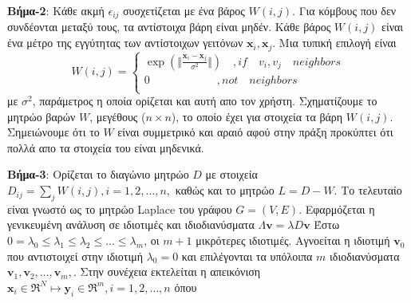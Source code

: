 \par
\textbf{Βήμα-2}: Κάθε ακμή $\epsilon_{ij}$ συσχετίζεται με ένα βάρος $W(i,j)$. Για κόμβους που δεν συνδέονται μεταξύ τους, τα αντίστοιχα βάρη είναι μηδέν. Κάθε βάρος $W(i,j)$ είναι ένα μέτρο της εγγύτητας των αντίστοιχων γειτόνων $\mathbf{x}_{i},\mathbf{x}_{j}$. Μια τυπική επιλογή είναι \\
\newline\hspace*{\fill}
\[W(i,j) = \begin{cases} \exp(\Vert \frac{\mathbf{x}_{i}-\mathbf{x}_{j}}{\sigma^{2}} \Vert) \quad ,if \quad v_{i},v_{j} \quad neighbors\\
               0  \quad \quad \quad \quad \quad \quad ,not \quad neighbors\\
            \end{cases} \]
\hspace*{\fill}\newline 
με $\sigma^{2}$, παράμετρος η οποία ορίζεται και αυτή απο τον χρήστη. Σχηματίζουμε το μητρώο βαρών $W$, μεγέθους ($n \times n$), το οποίο έχει για στοιχεία τα βάρη $W(i,j)$. Σημειώνουμε ότι το $W$ είναι συμμετρικό και αραιό αφού στην πράξη προκύπτει ότι πολλά απο τα στοιχεία του είναι μηδενικά.
\par
\textbf{Βήμα-3}: Ορίζεται το διαγώνιο μητρώο $D$ με στοιχεία $D_{ij}=\sum_{j} W(i,j),i=1,2,\ldots,n,$ καθώς και το μητρώο $L=D-W$. Το τελευταίο είναι γνωστό ως το μητρώο \textlatin{Laplace} του γράφου $G=(V,E)$. Εφαρμόζεται η γενικευμένη ανάλυση σε ιδιοτιμές και ιδιοδιανύσματα 
\newline\hspace*{\fill}
$ \Lambda \mathbf{v} =  \lambda D \mathbf{v} $
\hspace*{\fill}\newline 
Έστω $ 0 = \lambda_{0} \leq \lambda_{1} \leq \lambda_{2} \leq \ldots \leq \lambda_{m}$, οι $m+1$ μικρότερες ιδιοτιμές. Αγνοείται η ιδιοτιμή $\mathbf{v}_{0}$ που αντιστοιχεί στην ιδιοτιμή $\lambda_{0} = 0$ και επιλέγονται τα υπόλοιπα $m$ ιδιοδιανύσματα $\mathbf{v}_{1},\mathbf{v}_{2},\ldots,\mathbf{v}_{m},$. Στην συνέχεια εκτελείται η απεικόνιση
\newline\hspace*{\fill}
$\mathbf{x}_{i} \in \Re^{N} \mapsto \mathbf{y}_{i} \in \Re^{m}, i=1,2,\ldots,n$
\hspace*{\fill}\newline 
όπου 
\newline\hspace*{\fill}
